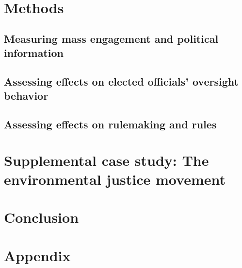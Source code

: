 \documentclass{article}
\begin{document}
\section{Methods}

\subsection{Measuring mass engagement and political information}


\subsection{Assessing effects on elected officials' oversight behavior}


\subsection{Assessing effects on rulemaking and rules}







\section{Supplemental case study: The environmental justice movement} \label{ej}




\section{Conclusion}

\section{Appendix}





\singlespace
\small
 

\end{document}
